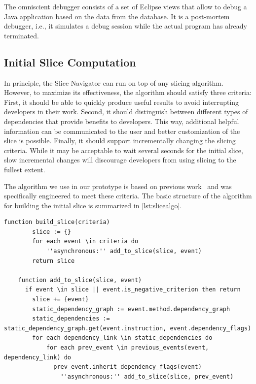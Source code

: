 \documentclass[
			english,
			review,
			]{elsarticle}
\begin{document}
The omniscient debugger consists of a set of Eclipse views that allow to debug a Java application based on the data from the database.
It is a post-mortem debugger, i.e., it simulates a debug session while the actual program has already terminated.

\subsection{Initial Slice Computation}

In principle, the Slice Navigator can run on top of any slicing algorithm.
However, to maximize its effectiveness, the algorithm should satisfy three criteria:
First, it should be able to quickly produce useful results to avoid interrupting developers in their work.
Second, it should distinguish between different types of dependencies that provide benefits to developers.
This way, additional helpful information can be communicated to the user and better customization of the slice is possible.
Finally, it should support incrementally changing the slicing criteria.
While it may be acceptable to wait several seconds for the initial slice, slow incremental changes will discourage developers from using slicing to the fullest extent.

The algorithm we use in our prototype is based on previous work~\cite{treffer_dynamic_2014} and was specifically engineered to meet these criteria.
The basic structure of the algorithm for building the initial slice is summarized in \cref{lst:slicealgo}.

\begin{lstlisting}[float=t,language=algorithm,label=lst:slicealgo,caption={Simplified algorithm for building the slice}]
	function build_slice(criteria)
		slice := {}
		for each event \in criteria do
			''asynchronous:'' add_to_slice(slice, event)
		return slice
		
	function add_to_slice(slice, event)
	  if event \in slice || event.is_negative_criterion then return
		slice += {event}
		static_dependency_graph := event.method.dependency_graph
		static_dependencies := static_dependency_graph.get(event.instruction, event.dependency_flags)
		for each dependency_link \in static_dependencies do
			for each prev_event \in previous_events(event, dependency_link) do
			  prev_event.inherit_dependency_flags(event)
				''asynchronous:'' add_to_slice(slice, prev_event)
\end{lstlisting}
\end{document}

